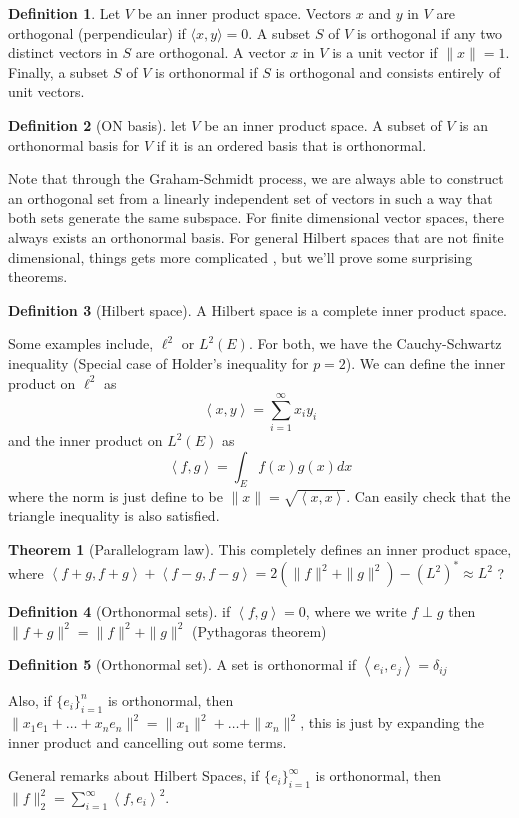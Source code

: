 \documentclass[12pt]{article}
\theoremstyle{definition}
\newtheorem{theorem}{Theorem}[section]
\newtheorem{definition}{Definition}[section]
\newcommand{\inprod}[1]{\left\langle #1 \right\rangle}
\begin{document}
\begin{definition}
Let \( V \) be an inner product space. Vectors \( x \) and \( y \) in \( V \) are orthogonal (perpendicular) if \( \langle x, y \rangle = 0 \). A subset \( S \) of \( V \) is orthogonal if any two distinct vectors in \( S \) are orthogonal. A vector \( x \) in \( V \) is a unit vector if \( \|x\| = 1 \). Finally, a subset \( S \) of \( V \) is orthonormal if \( S \) is orthogonal and consists entirely of unit vectors.
\end{definition}
\begin{definition}[ON basis]
	let $V$ be an inner product space. A subset of $V$ is an orthonormal basis for $V$ if it is an ordered basis that is orthonormal.
\end{definition}
Note that through the Graham-Schmidt process, we are always able to construct an orthogonal set from a linearly independent set of vectors in such a way that both sets generate the same subspace. For finite dimensional vector spaces, there always exists an orthonormal basis. For general Hilbert spaces that are not finite dimensional, things gets more complicated , but we'll prove some surprising theorems. 

\begin{definition}[Hilbert space]
	A Hilbert space is a complete inner product space. 
\end{definition}
Some examples include, $\ell^2$ or $L^2(E)$. For both, we have the Cauchy-Schwartz inequality (Special case of Holder's inequality for $p=2$). We can define the inner product on $\ell^2$ as 
$$
	\inprod{x,y} = \sum_{i=1}^\infty x_i y_i 
$$
and the inner product on $L^2(E)$ as
$$
	\inprod{f,g} = \int_E f(x)g(x)dx 
$$
where the norm is just define to be $\|x\| = \sqrt{\inprod{x,x}}$. Can easily check that the triangle inequality is also satisfied.
\begin{theorem}[Parallelogram law]
	This completely defines an inner product space, where $\inprod{f+g,f+g} + \inprod{f-g,f-g} = 2(\|f\|^2 + \|g\|^2) - (L^2)^* \approx L^2$ ? 	
\end{theorem}
\begin{definition}[Orthonormal sets]
	if $\inprod{f,g} = 0$, where we write $f \perp g$ then $\|f+g\|^2 = \|f\|^2 + \|g\|^2$ (Pythagoras theorem)	
\end{definition}
\begin{definition}[Orthonormal set]
	A set is orthonormal if $\inprod{e_i,e_j} = \delta_{ij}$	
\end{definition}
Also, if $\{e_i\}_{i=1}^n$ is orthonormal, then $\|x_1e_1 + \ldots + x_n e_n\|^2 = \|x_1\|^2 + \ldots + \|x_n\|^2$, this is just by expanding the inner product and cancelling out some terms. 

General remarks about Hilbert Spaces,
if $\{e_i\}_{i=1}^\infty$ is orthonormal, then $\|f\|_2^2 = \sum_{i=1}^\infty \inprod{f,e_i}^2$. 
\end{document}
